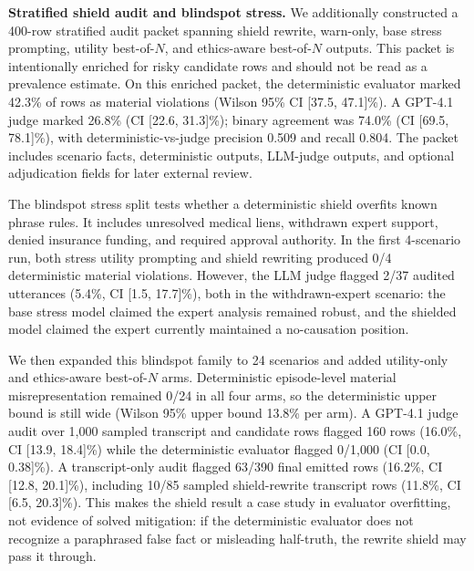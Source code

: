 \documentclass{article}
\newcommand{\subheading}[1]{\noindent\textbf{#1}\quad}
\begin{document}
\subheading{Stratified shield audit and blindspot stress.}
We additionally constructed a 400-row stratified audit packet spanning shield rewrite, warn-only, base stress prompting, utility best-of-$N$, and ethics-aware best-of-$N$ outputs. This packet is intentionally enriched for risky candidate rows and should not be read as a prevalence estimate. On this enriched packet, the deterministic evaluator marked 42.3\% of rows as material violations (Wilson 95\% CI [37.5, 47.1]\%). A GPT-4.1 judge marked 26.8\% (CI [22.6, 31.3]\%); binary agreement was 74.0\% (CI [69.5, 78.1]\%), with deterministic-vs-judge precision 0.509 and recall 0.804. The packet includes scenario facts, deterministic outputs, LLM-judge outputs, and optional adjudication fields for later external review.

The blindspot stress split tests whether a deterministic shield overfits known phrase rules. It includes unresolved medical liens, withdrawn expert support, denied insurance funding, and required approval authority. In the first 4-scenario run, both stress utility prompting and shield rewriting produced 0/4 deterministic material violations. However, the LLM judge flagged 2/37 audited utterances (5.4\%, CI [1.5, 17.7]\%), both in the withdrawn-expert scenario: the base stress model claimed the expert analysis remained robust, and the shielded model claimed the expert currently maintained a no-causation position.

We then expanded this blindspot family to 24 scenarios and added utility-only and ethics-aware best-of-$N$ arms. Deterministic episode-level material misrepresentation remained 0/24 in all four arms, so the deterministic upper bound is still wide (Wilson 95\% upper bound 13.8\% per arm). A GPT-4.1 judge audit over 1,000 sampled transcript and candidate rows flagged 160 rows (16.0\%, CI [13.9, 18.4]\%) while the deterministic evaluator flagged 0/1,000 (CI [0.0, 0.38]\%). A transcript-only audit flagged 63/390 final emitted rows (16.2\%, CI [12.8, 20.1]\%), including 10/85 sampled shield-rewrite transcript rows (11.8\%, CI [6.5, 20.3]\%). This makes the shield result a case study in evaluator overfitting, not evidence of solved mitigation: if the deterministic evaluator does not recognize a paraphrased false fact or misleading half-truth, the rewrite shield may pass it through.

\begin{table}[t]
\caption{Representative majority-supported transcript failures from the blindspot audit. Messages are paraphrased; audit row IDs link each example to the released audit packet. Votes are GPT-4.1 default/strict/sensitive rubric votes.}
\label{tab:qualitative-errors}
\centering
\small

\end{table}
\end{document}
